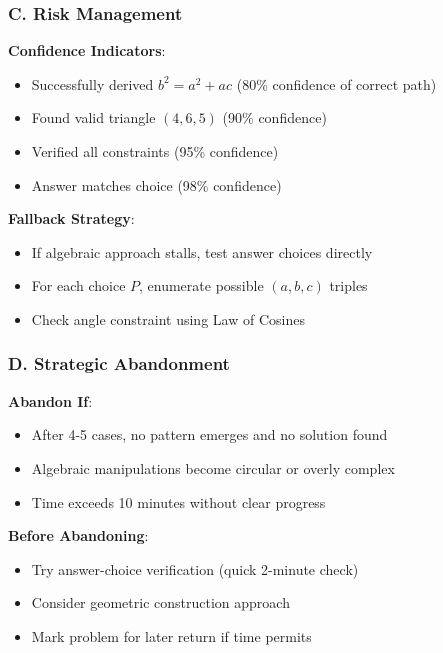 \documentclass[12pt]{article}
\begin{document}
\begin{competitionbox}
\subsubsection*{C. Risk Management}

\textbf{Confidence Indicators}:
\begin{itemize}
    \item Successfully derived $b^2 = a^2 + ac$ (80\% confidence of correct path)
    \item Found valid triangle $(4,6,5)$ (90\% confidence)
    \item Verified all constraints (95\% confidence)
    \item Answer matches choice (98\% confidence)
\end{itemize}

\textbf{Fallback Strategy}:
\begin{itemize}
    \item If algebraic approach stalls, test answer choices directly
    \item For each choice $P$, enumerate possible $(a,b,c)$ triples
    \item Check angle constraint using Law of Cosines
\end{itemize}

\subsubsection*{D. Strategic Abandonment}

\textbf{Abandon If}:
\begin{itemize}
    \item After 4-5 cases, no pattern emerges and no solution found
    \item Algebraic manipulations become circular or overly complex
    \item Time exceeds 10 minutes without clear progress
\end{itemize}

\textbf{Before Abandoning}:
\begin{itemize}
    \item Try answer-choice verification (quick 2-minute check)
    \item Consider geometric construction approach
    \item Mark problem for later return if time permits
\end{itemize}

\end{competitionbox}
\end{document}
